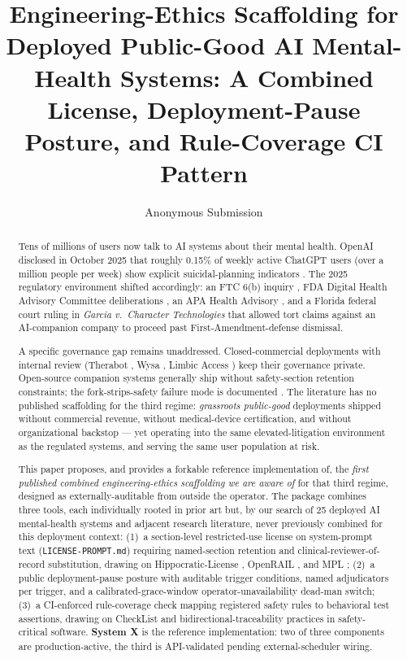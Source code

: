 \documentclass[letterpaper]{article} %
\title{Engineering-Ethics Scaffolding for Deployed Public-Good AI Mental-Health Systems: A Combined License, Deployment-Pause Posture, and Rule-Coverage CI Pattern}
\author{Anonymous Submission}
\begin{document}
\maketitle

\begin{abstract}
\noindent Tens of millions of users now talk to AI systems about their mental health. OpenAI disclosed in October 2025 that roughly 0.15\% of weekly active ChatGPT users (over a million people per week) show explicit suicidal-planning indicators \citep{openai2025strengthening}. The 2025 regulatory environment shifted accordingly: an FTC 6(b) inquiry \citep{ftc2025sixb}, FDA Digital Health Advisory Committee deliberations \citep{fda2025dhac}, an APA Health Advisory \citep{apa2025advisory}, and a Florida federal court ruling in \emph{Garcia v.\ Character Technologies} \citep{garcia2025character} that allowed tort claims against an AI-companion company to proceed past First-Amendment-defense dismissal.

A specific governance gap remains unaddressed. Closed-commercial deployments with internal review (Therabot \citep{heinz2025therabot}, Wysa \citep{inkster2018wysa}, Limbic Access \citep{habicht2024limbic}) keep their governance private. Open-source companion systems generally ship without safety-section retention constraints; the fork-strips-safety failure mode is documented \citep{aiid2023neda}. The literature has no published scaffolding for the third regime: \emph{grassroots public-good} deployments shipped without commercial revenue, without medical-device certification, and without organizational backstop --- yet operating into the same elevated-litigation environment as the regulated systems, and serving the same user population at risk.

This paper proposes, and provides a forkable reference implementation of, the \emph{first published combined engineering-ethics scaffolding we are aware of} for that third regime, designed as externally-auditable from outside the operator. The package combines three tools, each individually rooted in prior art but, by our search of 25 deployed AI mental-health systems and adjacent research literature, never previously combined for this deployment context: (1)~a section-level restricted-use license on system-prompt text (\texttt{LICENSE-PROMPT.md}) requiring named-section retention and clinical-reviewer-of-record substitution, drawing on Hippocratic-License \citep{hl3}, OpenRAIL \citep{openrail2022}, and MPL \citep{mpl2}; (2)~a public deployment-pause posture with auditable trigger conditions, named adjudicators per trigger, and a calibrated-grace-window operator-unavailability dead-man switch; (3)~a CI-enforced rule-coverage check mapping registered safety rules to behavioral test assertions, drawing on CheckList \citep{ribeiro2020checklist} and bidirectional-traceability practices in safety-critical software. \textbf{System X} is the reference implementation: two of three components are production-active, the third is API-validated pending external-scheduler wiring.


\end{abstract}
\end{document}
